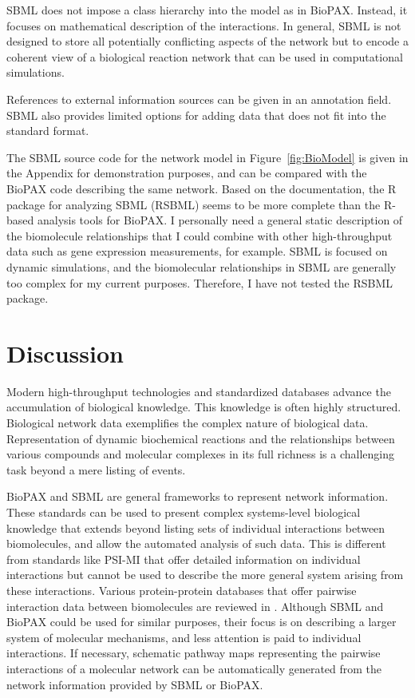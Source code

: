 \documentclass[a4paper,10pt,titlepage]{article}
\begin{document}
SBML does not impose a class hierarchy into the model as in BioPAX. Instead, it focuses on mathematical description of the interactions. In general, SBML is not designed to store all potentially conflicting aspects of the network but to encode a coherent view of a biological reaction network that can be used in computational simulations. 

References to external information sources can be given in an annotation field. SBML also provides limited options for adding data that does not fit into the standard format. 

The SBML source code for the network model in Figure~\ref{fig:BioModel} is given in the Appendix for demonstration purposes, and can be compared with the BioPAX code describing the same network. Based on the documentation, the R package for analyzing SBML (RSBML) seems to be more complete than the R-based analysis tools for BioPAX. I personally need a general static description of the biomolecule relationships that I could combine with other high-throughput data such as gene expression measurements, for example. SBML is focused on dynamic simulations, and the biomolecular relationships in SBML are generally too complex for my current purposes. Therefore, I have not tested the RSBML package.


\section{Discussion}

Modern high-throughput technologies and standardized databases advance the accumulation of biological knowledge. This knowledge is often highly structured. Biological network data exemplifies the complex nature of biological data. Representation of dynamic biochemical reactions and the relationships between various compounds and molecular complexes in its full richness is a challenging task beyond a mere listing of events.

BioPAX and SBML are general frameworks to represent network information. These standards can be used to present complex systems-level biological knowledge that extends beyond listing sets of individual interactions between biomolecules, and allow the automated analysis of such data. This is different from standards like PSI-MI \cite{Hermjakob04} that offer detailed information on individual interactions but cannot be used to describe the more general system arising from these interactions. Various protein-protein databases that offer pairwise interaction data between biomolecules are reviewed in \cite{Mathivanan06}. Although SBML and BioPAX could be used for similar purposes, their focus is on describing a larger system of molecular mechanisms, and less attention is paid to individual interactions. If necessary, schematic pathway maps representing the pairwise interactions of a molecular network can be automatically generated from the network information provided by SBML or BioPAX.
\end{document}
